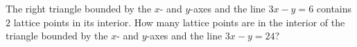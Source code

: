 The right triangle bounded by the $x$- and $y$-axes and the line $3x-y=6$ contains $2$ lattice points in its interior. How many lattice points are in the interior of the triangle bounded by the $x$- and $y$-axes and the line $3x-y=24$?
